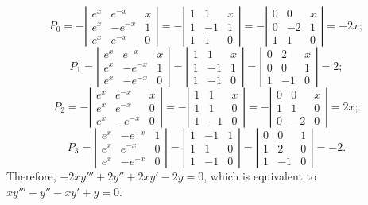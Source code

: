 \documentclass{ximera}
\begin{document}
\begin{problem}
\begin{enumerate}
\begin{solution}
$$
P_0=-
\left|\begin{array}{crc}
e^x&e^{-x}&x\\
e^x&-e^{-x}&1\\
e^x&e^{-x}&0
\end{array}\right|=
-\left|\begin{array}{crc}
1&1&x\\1&-1&1\\1&1&0
\end{array}\right|=
-\left|\begin{array}{crc}
0&0&x\\0&-2&1\\1&1&0
\end{array}\right|=-2x;
$$
$$
P_1=
\left|\begin{array}{crc}
e^x&e^{-x}&x\\e^x&-e^{-x}&1\\e^x&-e^{-x}&0
\end{array}\right|=
\left|\begin{array}{crc}
1&1&x\\1&-1&1\\1&-1&0
\end{array}\right|=
\left|\begin{array}{crc}
0&2&x\\0&0&1\\1&-1&0
\end{array}\right|=2;
$$
$$
P_2=
-\left|\begin{array}{crc}
e^x&e^{-x}&x\\e^x&e^{-x}&0\\e^x&-e^{-x}&0
\end{array}\right|=
-\left|\begin{array}{crc}
1&1&x\\1&1&0\\1&-1&0
\end{array}\right|=
-\left|\begin{array}{crc}
0&0&x\\1&1&0\\0&-2&0
\end{array}\right|=2x;
$$
$$
P_3=
\left|\begin{array}{crc}
e^x&-e^{-x}&1\\e^x&e^{-x}&0\\e^x&-e^{-x}&0
\end{array}\right|=
\left|\begin{array}{crc}
1&-1&1\\1&1&0\\1&-1&0
\end{array}\right|=
\left|\begin{array}{crc}
0&0&1\\1&2&0\\1&-1&0
\end{array}\right|=-2.
$$
Therefore,
$-2xy'''+2y''+2xy'-2y=0$,
which is equivalent to
$xy'''-y''-xy'+y=0$.
\end{solution}


\end{enumerate}
\end{problem}
\end{document}
